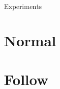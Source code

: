 \section{}
    \begin{frame}[allowframebreaks]{Experiments}
        \section{Normal}


        \section{Follow}
    \end{frame}

    \subsection{}
        
        
